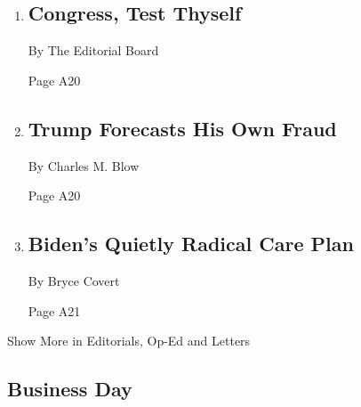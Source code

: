 \begin{enumerate}
\def\labelenumi{\arabic{enumi}.}
\item
  \href{/2020/08/02/opinion/coronavirus-gohmert-congress-testing.html}{}

  \hypertarget{congress-test-thyself}{%
  \subsection{Congress, Test Thyself}\label{congress-test-thyself}}

  By The Editorial Board

  Page A20
\item
  \href{/2020/08/02/opinion/trump-2020-election.html}{}

  \hypertarget{trump-forecasts-his-own-fraud}{%
  \subsection{Trump Forecasts His Own
  Fraud}\label{trump-forecasts-his-own-fraud}}

  By Charles M. Blow

  Page A20
\item
  \href{/2020/08/02/opinion/biden-child-care.html}{}

  \hypertarget{bidens-quietly-radical-care-plan}{%
  \subsection{Biden's Quietly Radical Care
  Plan}\label{bidens-quietly-radical-care-plan}}

  By Bryce Covert

  Page A21
\end{enumerate}

Show More in Editorials, Op-Ed and Letters

\hypertarget{business-day}{%
\subsection{Business Day}\label{business-day}}

